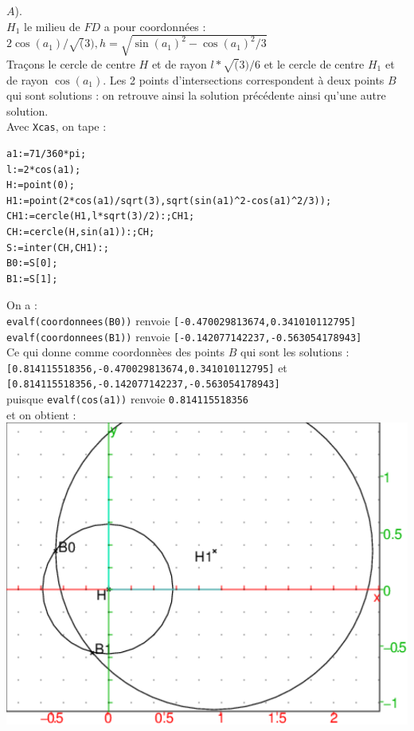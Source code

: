 \documentclass[a4paper,11pt]{book}
\begin{document}
\begin{itemize}
$A$).\\
$H_1$ le milieu de $FD$ a pour coordonn\'ees :\\
$2\cos(a_1)/\sqrt(3),h=\sqrt{\sin(a_1)^2-\cos(a_1)^2/3}$\\
Tra\c{c}ons le cercle de centre $H$ et de rayon $l*\sqrt(3)/6$ et 
le cercle de centre $H_1$ et de rayon $\cos(a_1)$. Les 2 points d'intersections 
correspondent \`a deux points $B$ qui sont solutions : on retrouve ainsi la 
solution pr\'ec\'edente ainsi qu'une autre solution.\\
Avec {\tt Xcas}, on tape :
\begin{verbatim} 
a1:=71/360*pi;
l:=2*cos(a1);
H:=point(0);
H1:=point(2*cos(a1)/sqrt(3),sqrt(sin(a1)^2-cos(a1)^2/3));
CH1:=cercle(H1,l*sqrt(3)/2):;CH1;
CH:=cercle(H,sin(a1)):;CH;
S:=inter(CH,CH1):;
B0:=S[0];
B1:=S[1];
\end{verbatim}
On a :\\
{\tt evalf(coordonnees(B0))} renvoie {\tt [-0.470029813674,0.341010112795]}\\
{\tt  evalf(coordonnees(B1))} renvoie {\tt [-0.142077142237,-0.563054178943]}\\
Ce qui donne comme coordonn\`ees des points $B$ qui sont les solutions :\\
 {\tt [0.814115518356,-0.470029813674,0.341010112795]} et \\
{\tt [0.814115518356,-0.142077142237,-0.563054178943]} \\
puisque {\tt evalf(cos(a1))} renvoie {\tt 0.814115518356}\\
et on obtient :\\
\includegraphics[width=\textwidth]{cyclohex4}\\

\end{itemize}
\end{document}
